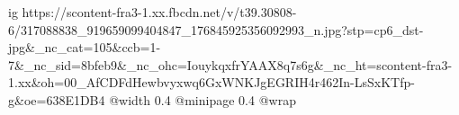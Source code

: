  
 
 
 
 

\ifcmt
  ig https://scontent-fra3-1.xx.fbcdn.net/v/t39.30808-6/317088838_919659099404847_176845925356092993_n.jpg?stp=cp6_dst-jpg&_nc_cat=105&ccb=1-7&_nc_sid=8bfeb9&_nc_ohc=IouykqxfrYAAX8q7s6g&_nc_ht=scontent-fra3-1.xx&oh=00_AfCDFdHewbvyxwq6GxWNKJgEGRIH4r462In-LsSxKTfp-g&oe=638E1DB4
  @width 0.4
  @minipage 0.4
  @wrap \parpic[r]
\fi
